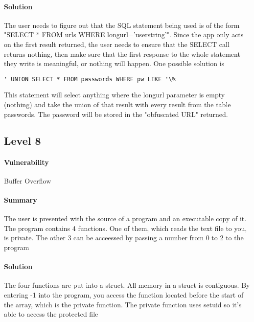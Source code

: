 \documentclass[12pt]{article}
\begin{document}
\paragraph{Solution} The user needs to figure out that the SQL statement being used is of the form 
"SELECT * FROM urls WHERE longurl='userstring'".  Since the app only acts on the first result returned, the
user needs to ensure that the SELECT call returns nothing, then make sure that the first response to the whole
statement they write is meaningful, or nothing will happen.  One possible solution is 
\begin{verbatim} 
' UNION SELECT * FROM passwords WHERE pw LIKE '\%
\end{verbatim}
This statement will select anything where the longurl parameter is empty (nothing) and take the union of that
result with every result from the table passwords.  The password will be stored in the "obfuscated URL" returned.
\subsection{Level 8}
\paragraph{Vulnerability} Buffer Overflow
\paragraph{Summary} The user is presented with the source of a program and an
executable copy of it. The program contains 4 functions. One of them, which
reads the text file to you, is private. The other 3 can be acceessed by passing
a number from 0 to 2 to the program
\paragraph{Solution} The four functions are put into a struct. All memory in a
struct is contiguous. By entering -1 into the program, you access the function
located before the start of the array, which is the private function. The
private function uses setuid so it's able to access the protected file
\end{document}
